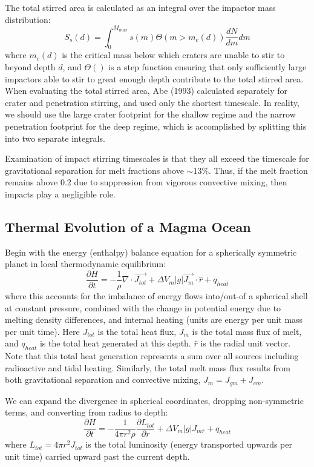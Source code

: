 The total stirred area is calculated as an integral over the impactor mass distribution:
\begin{equation}
  S_s(d)= \int_0^{M_{max}} s(m)\Theta(m > m_c(d))  \frac{dN}{dm} dm
\end{equation}
where $m_c(d)$ is the critical mass below which craters are unable to stir to beyond depth $d$, and $\Theta()$ is a step function ensuring that only sufficiently large impactors able to stir to great enough depth contribute to the total stirred area.
When evaluating the total stirred area, Abe (1993) calculated separately for crater and penetration stirring, and used only the shortest timescale.
In reality, we should use the large crater footprint for the shallow regime and the narrow penetration footprint for the deep regime, which is accomplished by splitting this into two separate integrals.

Examination of impact stirring timescales is that they all exceed the timescale for gravitational separation for melt fractions above $\sim$13\%.
Thus, if the melt fraction remains above 0.2 due to suppression from vigorous convective mixing, then impacts play a negligible role.


\subsection{Thermal Evolution of a Magma Ocean}
Begin with the energy (enthalpy) balance equation for a spherically symmetric planet in local thermodynamic equilibrium: 
\begin{equation}
  \frac{\partial H}{\partial t} = - \frac{1}{\rho}\nabla \cdot \vec{J_{tot}} + \Delta V_m|g|\vec{J_m} \cdot \hat{r} + q_{heat}
\end{equation}
where this accounts for the imbalance of energy flows into/out-of a spherical shell at constant pressure, combined with the change in potential energy due to melting density differences, and internal heating (units are energy per unit mass per unit time).
Here  $J_{tot}$ is the total heat flux, $J_m$ is the total mass flux of melt, and $q_{heat}$ is the total heat generated at this depth.  $\hat{r}$ is the radial unit vector.
Note that this total heat generation represents a sum over all sources including radioactive and tidal heating.
Similarly, the total melt mass flux results from both gravitational separation and convective mixing, ${J_m = J_{gm} + J_{cm}}$.

We can expand the divergence in spherical coordinates, dropping non-symmetric terms, and converting from radius to depth: 
\begin{equation}
  \frac{\partial H}{\partial t} = - \frac{1}{4\pi r^2 \rho} \frac{\partial L_{tot}}{\partial r} + \Delta V_m|g|J_{m\hat{r}} + q_{heat}
\end{equation}
where $L_{tot} = 4 \pi r^2 J_{tot}$ is the total luminosity (energy transported upwards per unit time) carried upward past the current depth. 

